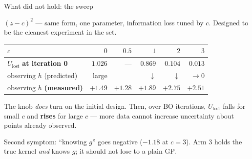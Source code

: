 \documentclass[aspectratio=169,11pt]{beamer}
\newcommand{\Ulost}{U_{\text{lost}}}
\newcommand{\bad}{\textcolor{red!70!black}}
\begin{document}
\begin{frame}{What did not hold: the sweep}

$(z-c)^2$ --- same form, one parameter, information loss tuned by $c$. Designed
to be the cleanest experiment in the set.

\bigskip
\begin{center}
\begin{tabular}{lrrrrr}
\toprule
$c$ & $0$ & $0.5$ & $1$ & $2$ & $3$ \\
\midrule
$\Ulost$ \textbf{at iteration 0} & $1.026$ & --- & $0.869$ & $0.104$ & $0.013$ \\
observing $h$ (predicted) & large & & $\downarrow$ & $\downarrow$ & $\to 0$ \\
observing $h$ \textbf{(measured)} & \bad{$+1.49$} & \bad{$+1.28$} & \bad{$+1.89$} & \bad{$+2.75$} & \bad{$+2.51$} \\
\bottomrule
\end{tabular}
\end{center}

\bigskip
The knob \emph{does} turn on the initial design. Then, over BO iterations,
$\Ulost$ falls for small $c$ and \textbf{rises} for large $c$ --- more data
cannot increase uncertainty about points already observed.

\medskip
Second symptom: ``knowing $g$'' goes \bad{negative} ($-1.18$ at $c=3$). Arm 3
holds the true kernel \emph{and} knows $g$; it should not lose to a plain GP.

\end{frame}
\end{document}
